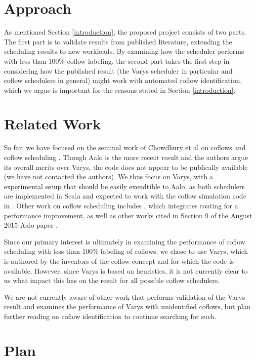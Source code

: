 \documentclass{article}
\begin{document}
\section{Approach}

As mentioned Section \ref{introduction}, the proposed project consists of two parts. The first part is to validate results from published literature, extending the scheduling results to new workloads. By examining how the scheduler performs with less than 100\% coflow labeling, the second part takes the first step in considering how the published result (the Varys scheduler in particular and coflow schedulers in general) might work with automated coflow identification, which we argue is important for the reasons stated in Section \ref{introduction}.

\section{Related Work}

So far, we have focused on the seminal work of Chowdhury et al on coflows and coflow scheduling \cite{chowdhury2012coflow, chowdhury2014varys, chowdhury2015aalo}. Though Aalo is the more recent result and the authors argue its overall merits over Varys, the code does not appear to be publically available (we have not contacted the authors). We thus focus on Varys, with a experimental setup that should be easily exendtible to Aalo, as both schedulers are implemented in Scala and expected to work with the coflow simulation code in \cite{website:coflow-repo}. Other work on coflow scheduling includes \cite{zhao2015rapier}, which integrates routing for a performance improvement, as well as other works cited in Section 9 of the August 2015 Aalo paper \cite{chowdhury2015aalo}. 

Since our primary interest is ultimately in examining the performance of coflow scheduling with less than 100\% labeling of coflows, we chose to use Varys, which is authored by the inventors of the coflow concept and for which the code is available. However, since Varys is based on heuristics, it is not currently clear to us what impact this has on the result for all possible coflow schedulers.

We are not currently aware of other work that performs validation of the Varys result and examines the performance of Varys with unidentified coflows, but plan further reading on coflow identification to continue searching for such. 

\section{Plan}
\end{document}
